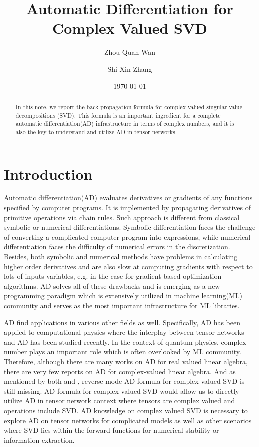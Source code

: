 \documentclass[aps,prl,singlecolumn,preprintnumbers,amsmath,amssymb,notitlepage]{revtex4-1}
\newcommand{\<}{\langle}
\renewcommand{\>}{\rangle}
\begin{document}
\title{Automatic Differentiation for Complex Valued SVD}
\author{Zhou-Quan Wan}
\author{Shi-Xin Zhang}

\begin{abstract}
In this note, we report the back propagation formula for complex valued singular value decompositions (SVD).  This formula is an important ingredient for a complete automatic differentiation(AD) infrastructure in terms of complex numbers, and it is also the key to understand and utilize AD in tensor networks.
\end{abstract}

\date{\today}
\maketitle

\section{Introduction}

Automatic differentiation(AD) evaluates derivatives or gradients of any functions specified by computer programs\cite{Biggs2000}. It is implemented by propagating derivatives of primitive operations via chain rules. Such approach is different from classical symbolic or numerical differentiations.
Symbolic differentiation faces the challenge of converting a complicated computer program into expressions, while numerical differentiation faces the difficulty of numerical errors in the discretization. 
Besides, both symbolic and numerical methods have problems in calculating higher order derivatives and are also slow at computing gradients with respect to lots of inputs variables, e.g. in the case for gradient-based optimization algorithms. 
AD solves all of these drawbacks and is emerging as a new programming paradigm which is extensively utilized in machine learning(ML) community and serves as the most important infrastructure for ML libraries.

AD find applications in various other fields as well. Specifically, AD has been applied to computational physics where the interplay between tensor networks and AD has been studied recently\cite{Liao2019, Torlai2019}. In the context of quantum physics, complex number plays an important role which is often overlooked by ML community. Therefore, although there are many works on AD for real valued linear algebra\cite{Giles2008, Townsend2016, Seeger2017}, there are very few reports on AD for complex-valued linear algebra\cite{Hubig2019, Liu2019}. And as mentioned by both \cite{Torlai2019} and \cite{Hubig2019}, reverse mode AD formula for complex valued SVD is still missing. AD formula for complex valued SVD would allow us to directly utilize AD in tensor network context where tensors are complex valued and operations include SVD. AD knowledge on complex valued SVD is necessary to explore AD on tensor networks for complicated models as well as other scenarios where SVD lies within the forward functions for numerical stability or information extraction. 
\end{document}

